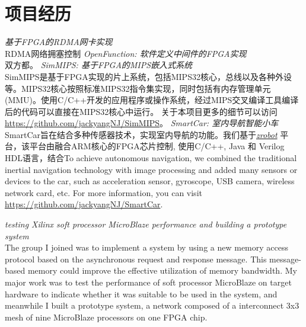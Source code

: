 \documentclass[11pt,a4paper]{moderncv}
\begin{document}
\section{项目经历}
{
	\smallskip
	\emph{基于FPGA的RDMA网卡实现}
	\medskip \\
	RDMA网络拥塞控制	
}
{
	\smallskip
	\emph{OpenFunction: 软件定义中间件的FPGA实现}
	\medskip \\
	双方都。	
}
{
    \smallskip
    \emph{SimMIPS: 基于FPGA的MIPS嵌入式系统}
    \medskip \\
    SimMIPS是基于FPGA实现的片上系统，包括MIPS32核心，总线以及各种外设等。MIPS32核心按照标准MIPS32指令集实现，同时包括有内存管理单元(MMU)。使用C/C++开发的应用程序或操作系统，经过MIPS交叉编译工具编译后的代码可以直接在MIPS32核心中运行。
    关于本项目更多的细节可以访问 \url{https://github.com/jackyangNJ/SimMIPS}。
}
{
    \smallskip
    \emph{SmartCar: 室内导航智能小车}
    \medskip  \\
    SmartCar旨在结合多种传感器技术，实现室内导航的功能。我们基于\href{http://zrobot.org/}{\emph{zrobot}} 平台，该平台由融合ARM核心的FPGA芯片控制, 使用C/C++, Java 和 Verilog HDL语言，结合To achieve autonomous navigation, we combined the traditional inertial navigation technology with image processing and added many sensors or devices to the car, such as acceleration sensor, gyroscope, USB camera, wireless network card, etc. For more information, you can visit \url{https://github.com/jackyangNJ/SmartCar}.
}

{
    \smallskip
    \emph{testing Xilinx soft processor MicroBlaze performance and building a prototype system}
    \medskip  \\
    The group I joined was to implement a system by using a new memory access protocol based on the asynchronous request and response message.
    This message-based memory could improve the effective utilization of memory bandwidth.
    My major work was to test the performance of soft processor MicroBlaze on target hardware to indicate whether it was suitable to be used in the system, and meanwhile I built a prototype system, a network composed of a interconnect 3x3 mesh of nine MicroBlaze processors on one FPGA chip.
}


\end{document}
